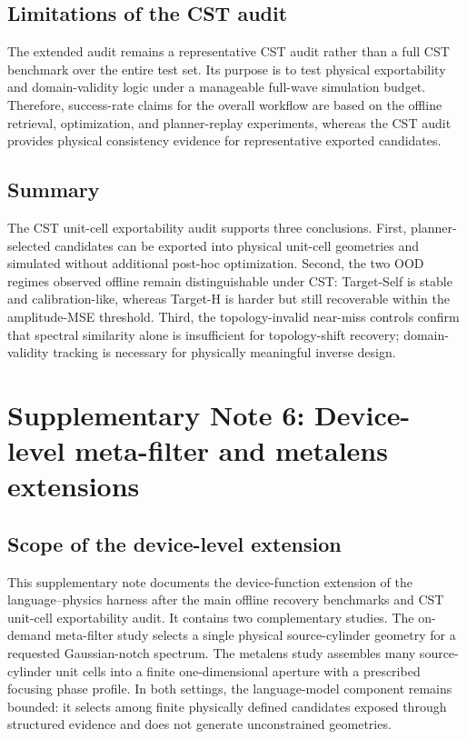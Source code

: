 \documentclass[final,1p,times]{elsarticle}
\begin{document}
\subsection{Limitations of the CST audit}

The extended audit remains a representative CST audit rather than a full CST benchmark over the entire test set. Its purpose is to test physical exportability and domain-validity logic under a manageable full-wave simulation budget. Therefore, success-rate claims for the overall workflow are based on the offline retrieval, optimization, and planner-replay experiments, whereas the CST audit provides physical consistency evidence for representative exported candidates.

\subsection{Summary}

The CST unit-cell exportability audit supports three conclusions. First, planner-selected candidates can be exported into physical unit-cell geometries and simulated without additional post-hoc optimization. Second, the two OOD regimes observed offline remain distinguishable under CST: Target-Self is stable and calibration-like, whereas Target-H is harder but still recoverable within the amplitude-MSE threshold. Third, the topology-invalid near-miss controls confirm that spectral similarity alone is insufficient for topology-shift recovery; domain-validity tracking is necessary for physically meaningful inverse design.


\section{Supplementary Note 6: Device-level meta-filter and metalens extensions}

\subsection{Scope of the device-level extension}

This supplementary note documents the device-function extension of the language--physics harness after the main offline recovery benchmarks and CST unit-cell exportability audit. It contains two complementary studies. The on-demand meta-filter study selects a single physical source-cylinder geometry for a requested Gaussian-notch spectrum. The metalens study assembles many source-cylinder unit cells into a finite one-dimensional aperture with a prescribed focusing phase profile. In both settings, the language-model component remains bounded: it selects among finite physically defined candidates exposed through structured evidence and does not generate unconstrained geometries.
\end{document}
